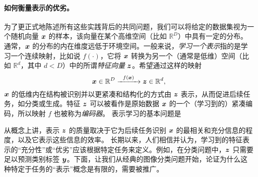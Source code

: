 \documentclass[../../book-main.tex]{subfiles}
\begin{document}
\paragraph{如何衡量表示的优劣。}
为了更正式地陈述所有这些实践背后的共同问题，我们可以将给定的数据集视为一个随机向量 $\bm{x}$ 的样本，该向量在某个高维空间（比如 $\mathbb{R}^D$）中具有一定的分布。通常，$\bm{x}$ 的分布的内在维度远低于环境空间。一般来说，{\em 学习一个表示}指的是学习一个连续映射，比如说 $f(\cdot)$，它将 $\bm{x}$ 转换为另一个（通常是低维）空间（比如 $\mathbb{R}^d$，其中 $d < D$）中的所谓{\em 特征向量} $\bm{z}$。希望通过这样的映射
\begin{equation}
	\bm{x} \in \mathbb{R}^D \xrightarrow{\hspace{2mm} f(\bm{x})\hspace{2mm}} \bm{z}  \in \mathbb{R}^d,
	\label{eqn:chap4-1-encoding}
\end{equation}
$\bm{x}$ 的低维内在结构被识别并以更紧凑和结构化的方式由 $\bm{z}$ 表示，从而促进后续任务，如分类或生成。特征 $\bm{z}$ 可以被看作是原始数据 $\bm{x}$ 的一个（学习到的）紧凑编码，所以映射 $f$ 也被称为\textit{编码器}。
表示学习的基本问题是
\begin{center}
\end{center}

从概念上讲，表示 $\bm{z}$ 的质量取决于它为后续任务识别 $\bm{x}$ 的最相关和充分信息的程度，以及它表示这些信息的效率。
长期以来，人们相信并认为，学习到的特征表示的“充分性”或“优劣”应该根据特定任务来定义。例如，在分类问题中，$\bm{z}$ 只需要足以预测类别标签 $\bm{y}$。下面，让我们从经典的图像分类问题开始，论证为什么这种特定于任务的“表示”概念是有限的，需要被推广。

\end{document}

